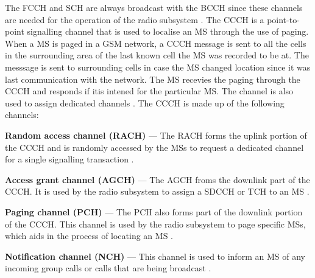 The FCCH and SCH are always broadcast with the BCCH since these channels are needed for the operation of the radio subsystem \cite{GSMArchitectureProtocolsServices}. The CCCH is a point-to-point signalling channel that is used to localise an MS through the use of paging\cite{GSMArchitectureProtocolsServices}. When a MS is paged in a GSM network, a CCCH message is sent to all the cells in the surrounding area of the last known cell the MS was recorded to be at\cite{GSMArchitectureProtocolsServices}. The messsage is sent to surrounding cells in case the MS changed location since it was last communication with the network\cite{GSMArchitectureProtocolsServices}. The MS recevies the paging through the CCCH and responds if itis intened for the particular MS\cite{GSMArchitectureProtocolsServices}. The channel is also used to assign dedicated channels \cite{GSMArchitectureProtocolsServices}. The CCCH is made up of the following channels:
\begin{description}
\item{\textbf{Random access channel (RACH)}} --- The RACH forms the uplink portion of the CCCH and is randomly accessed by the MSs to request a dedicated channel for a single signalling transaction \cite{GSMArchitectureProtocolsServices}.
\item{\textbf{Access grant channel (AGCH)}} --- The AGCH froms the downlink part of the CCCH. It is used by the radio subsystem to assign a SDCCH or TCH to an MS \cite{GSMArchitectureProtocolsServices}.
\item{\textbf{Paging channel (PCH)}} --- The PCH also forms part of the downlink portion of the CCCH. This channel is used by the radio subsystem to page specific MSs, which aids in the process of locating an MS \cite{GSMArchitectureProtocolsServices}.
\item{\textbf{Notification channel (NCH)}} --- This channel is used to inform an MS of any incoming group calls or calls that are being broadcast \cite{GSMArchitectureProtocolsServices}.
\end{description}

